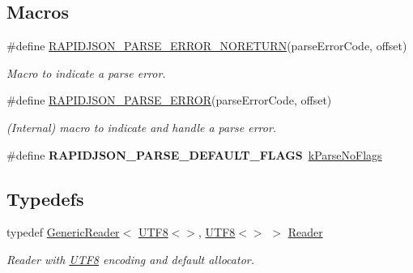 \subsection*{Macros}
\begin{DoxyCompactItemize}
\item 
\#define \hyperlink{a00635_ga7f8c4265b2edda78568ae3338aaf1461}{R\+A\+P\+I\+D\+J\+S\+O\+N\+\_\+\+P\+A\+R\+S\+E\+\_\+\+E\+R\+R\+O\+R\+\_\+\+N\+O\+R\+E\+T\+U\+RN}(parse\+Error\+Code,  offset)
\begin{DoxyCompactList}\small\item\em Macro to indicate a parse error. \end{DoxyCompactList}\item 
\#define \hyperlink{a00635_gae3689840fa6e89a241313f33b602f865}{R\+A\+P\+I\+D\+J\+S\+O\+N\+\_\+\+P\+A\+R\+S\+E\+\_\+\+E\+R\+R\+OR}(parse\+Error\+Code,  offset)
\begin{DoxyCompactList}\small\item\em (Internal) macro to indicate and handle a parse error. \end{DoxyCompactList}\item 
\mbox{\label{a00563_a77005e892e6601599beaf421b0395c31}} 
\#define {\bfseries R\+A\+P\+I\+D\+J\+S\+O\+N\+\_\+\+P\+A\+R\+S\+E\+\_\+\+D\+E\+F\+A\+U\+L\+T\+\_\+\+F\+L\+A\+GS}~\hyperlink{a00563_ab7be7dabe6ffcba60fad441505583450a1af603dc5f65bb815316589e782bc71a}{k\+Parse\+No\+Flags}
\end{DoxyCompactItemize}
\subsection*{Typedefs}
\begin{DoxyCompactItemize}
\item 
\mbox{\label{a00563_a84f3b66a66647f4ac4267078359188ba}} 
typedef \hyperlink{a02220}{Generic\+Reader}$<$ \hyperlink{a02144}{U\+T\+F8}$<$$>$, \hyperlink{a02144}{U\+T\+F8}$<$$>$ $>$ \hyperlink{a00563_a84f3b66a66647f4ac4267078359188ba}{Reader}
\begin{DoxyCompactList}\small\item\em Reader with \hyperlink{a02144}{U\+T\+F8} encoding and default allocator. \end{DoxyCompactList}\end{DoxyCompactItemize}
